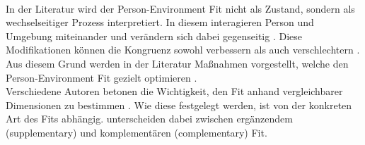 \\
In der Literatur wird der Person-Environment Fit nicht als Zustand, sondern als wechselseitiger Prozess interpretiert. In diesem interagieren Person und Umgebung miteinander und verändern sich dabei gegenseitig \cite[S. 21f.]{roberts:2006}. Diese Modifikationen können die Kongruenz sowohl verbessern als auch verschlechtern \cite[S. 4]{caplan:1987}. Aus diesem Grund werden in der Literatur Maßnahmen vorgestellt, welche den Person-Environment Fit gezielt optimieren \cite[S. 16]{cable:2001}.\\
Verschiedene Autoren betonen die Wichtigkeit, den Fit anhand vergleichbarer Dimensionen zu bestimmen \cite[S. 5]{caplan:1987}\cite{copingAndAdaption:1974}. Wie diese festgelegt werden, ist von der konkreten Art des Fits abhängig. \textcite[S. 1]{muchinsky:1987} unterscheiden dabei zwischen ergänzendem (supplementary) und komplementären (complementary) Fit. \\

